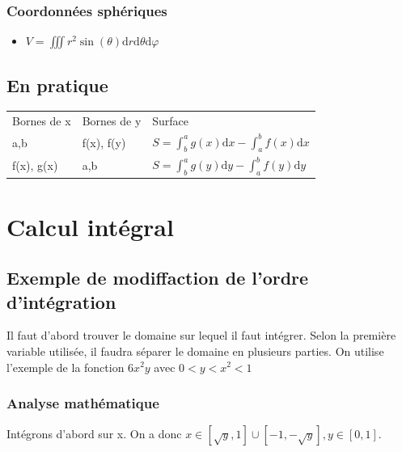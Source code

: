 \documentclass[french]{yLectureNote}
\newcommand{\dd}{\mathrm{d}}
\begin{document}
\subsubsection{Coordonnées sphériques}
\begin{itemize}
 \item \(V = \iiint r^2 \sin(\theta)\dd r\dd \theta\dd \varphi\)
\end{itemize}
\subsection{En pratique}
\begin{center}
\begin{tabular}{lll}
Bornes de x & Bornes de y & Surface\\
a,b & f(x), f(y) & \(S = \int_b^ag(x)\dd x-\int_a^bf(x)\dd x\)\\
f(x), g(x) & a,b & \(S = \int_b^ag(y)\dd y-\int_a^bf(y)\dd y\)
\end{tabular}
\end{center}
\section{Calcul intégral}
\subsection{Exemple de modiffaction de l'ordre d'intégration}
Il faut d'abord trouver le domaine sur lequel il faut intégrer. Selon la première variable utilisée, il faudra séparer le domaine en plusieurs parties. On utilise l'exemple de la fonction \(6x^2y\) avec \(0<y<x^2<1\)
\subsubsection{Analyse mathématique}
Intégrons d'abord sur x. On a donc \(x\in [\sqrt{y},1] \cup [-1, -\sqrt{y}], y\in[0,1]\).
\end{document}
